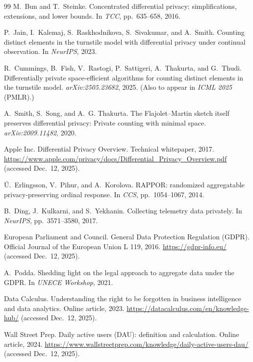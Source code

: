 \documentclass[11pt]{article}
\begin{document}
\begin{thebibliography}{99}
M.~Bun and T.~Steinke.
Concentrated differential privacy: simplifications, extensions, and lower bounds.
In \textit{TCC}, pp.~635--658, 2016.

P.~Jain, I.~Kalemaj, S.~Raskhodnikova, S.~Sivakumar, and A.~Smith.
Counting distinct elements in the turnstile model with differential privacy under continual observation.
In \textit{NeurIPS}, 2023.

R.~Cummings, B.~Fish, V.~Rastogi, P.~Sattigeri, A.~Thakurta, and G.~Thudi.
Differentially private space-efficient algorithms for counting distinct elements in the turnstile model.
\textit{arXiv:2505.23682}, 2025. (Also to appear in \textit{ICML 2025} (PMLR).)

A.~Smith, S.~Song, and A.~G. Thakurta.
The Flajolet--Martin sketch itself preserves differential privacy: Private counting with minimal space.
\textit{arXiv:2009.11482}, 2020.

Apple Inc.
Differential Privacy Overview.
Technical whitepaper, 2017. \url{https://www.apple.com/privacy/docs/Differential_Privacy_Overview.pdf} (accessed Dec.\ 12, 2025).

\'U.~Erlingsson, V.~Pihur, and A.~Korolova.
RAPPOR: randomized aggregatable privacy-preserving ordinal response.
In \textit{CCS}, pp.~1054--1067, 2014.

B.~Ding, J.~Kulkarni, and S.~Yekhanin.
Collecting telemetry data privately.
In \textit{NeurIPS}, pp.~3571--3580, 2017.

European Parliament and Council.
General Data Protection Regulation (GDPR).
Official Journal of the European Union L 119, 2016. \url{https://gdpr-info.eu/} (accessed Dec.\ 12, 2025).

A.~Podda.
Shedding light on the legal approach to aggregate data under the GDPR.
In \textit{UNECE Workshop}, 2021.

Data Calculus.
Understanding the right to be forgotten in business intelligence and data analytics.
Online article, 2023. \url{https://datacalculus.com/en/knowledge-hub/} (accessed Dec.\ 12, 2025).

Wall Street Prep.
Daily active users (DAU): definition and calculation.
Online article, 2024. \url{https://www.wallstreetprep.com/knowledge/daily-active-users-dau/} (accessed Dec.\ 12, 2025).


\end{thebibliography}
\end{document}
